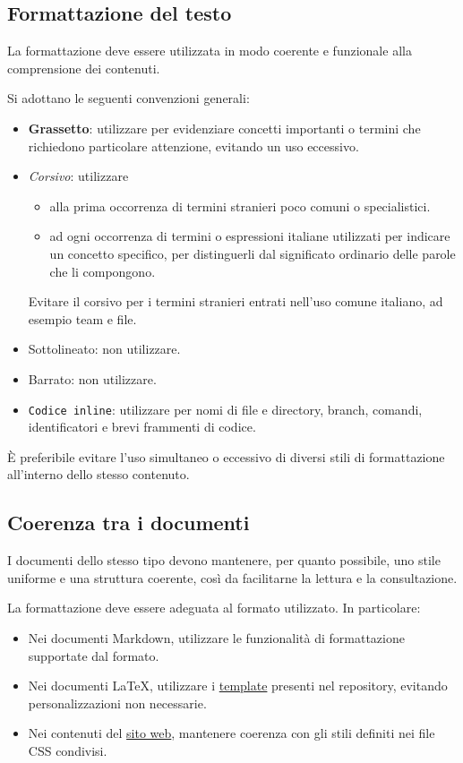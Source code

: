 \documentclass[11pt, a4paper]{article}
\begin{document}
\subsection{Formattazione del testo}
\label{subsec:formattazione-del-testo}

La formattazione deve essere utilizzata in modo coerente e funzionale alla comprensione dei contenuti.

Si adottano le seguenti convenzioni generali:
\begin{itemize}
    \item \textbf{Grassetto}: utilizzare per evidenziare concetti importanti o termini che richiedono particolare attenzione, evitando un uso eccessivo.
    \item \textit{Corsivo}: utilizzare
    \begin{itemize}
        \item alla prima occorrenza di termini stranieri poco comuni o specialistici.
        \item ad ogni occorrenza di termini o espressioni italiane utilizzati per indicare un concetto specifico, per distinguerli dal significato ordinario delle parole che li compongono.
    \end{itemize}

    \noindent Evitare il corsivo per i termini stranieri entrati nell'uso comune italiano, ad esempio team e file.
    \item Sottolineato: non utilizzare.
    \item Barrato: non utilizzare.
    \item \texttt{Codice inline}: utilizzare per nomi di file e directory, branch, comandi, identificatori e brevi frammenti di codice.
\end{itemize}

\noindent È preferibile evitare l'uso simultaneo o eccessivo di diversi stili di formattazione all'interno dello stesso contenuto.

\subsection{Coerenza tra i documenti}

I documenti dello stesso tipo devono mantenere, per quanto possibile, uno stile uniforme e una struttura coerente, così da facilitarne la lettura e la consultazione.

La formattazione deve essere adeguata al formato utilizzato. In particolare:
\begin{itemize}
    \item Nei documenti Markdown, utilizzare le funzionalità di formattazione supportate dal formato.
    \item Nei documenti LaTeX, utilizzare i \href{https://github.com/On-By-One-Team/On-By-One.github.io/blob/main/docs/tex/templates}{template} presenti nel repository, evitando personalizzazioni non necessarie.
    \item Nei contenuti del \href{https://on-by-one-team.github.io/On-By-One.github.io/}{sito web}, mantenere coerenza con gli stili definiti nei file CSS condivisi.
\end{itemize}
\end{document}
